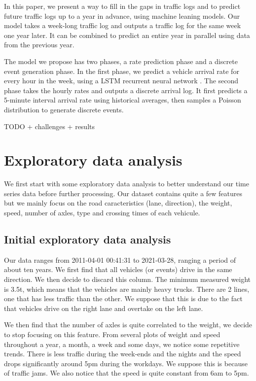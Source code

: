 \documentclass[10pt,conference,compsocconf]{IEEEtran}
\begin{document}
In this paper, we present a way to fill in the gaps in traffic logs and to predict future traffic 
logs up to a year in advance, using machine leaning models. Our model takes a week-long traffic
log and outputs a traffic log for the same week one year later. It can be combined to predict an 
entire year in parallel using data from the previous year. 

The model we propose has two phases, a rate prediction phase and a discrete event generation phase.
In the first phase, we predict a vehicle arrival rate for every hour in the week, using a LSTM 
recurrent neural network \cite{LSTM}. The second phase takes the hourly rates and outputs a discrete 
arrival log. It first predicts a 5-minute interval arrival rate using historical averages, then samples
a Poisson distribution to generate discrete events.

TODO + challenges + results


\section{Exploratory data analysis}

We first start with some exploratory data analysis to better understand our time series data before further processing. Our dataset contains quite a few features but we mainly focus on the road caracteristics (lane, direction), the weight, speed, number of axles, type and crossing times of each vehicule. 

\subsection{Initial exploratory data analysis}

Our data ranges from 2011-04-01 00:41:31 to 2021-03-28, ranging a period of about ten years. We first find that all vehicles (or events) drive in the same direction. We then decide to discard this column. The minimum measured weight is 3.5t, which means that the vehicles are mainly heavy trucks. There are 2 lines, one that has less traffic than the other. We suppose that this is due to the fact that vehicles drive on the right lane and overtake on the left lane.

We then find that the number of axles is quite correlated to the weight, we decide to stop focusing on this feature. From several plots of weight and speed throughout a year, a month, a week and some days, we notice some repetitive trends. There is less traffic during the week-ends and the nights and the speed drops significantly around 5pm during the workdays. We suppose this is because of traffic jams. We also notice that the speed is quite constant from 6am to 5pm. 
\end{document}

